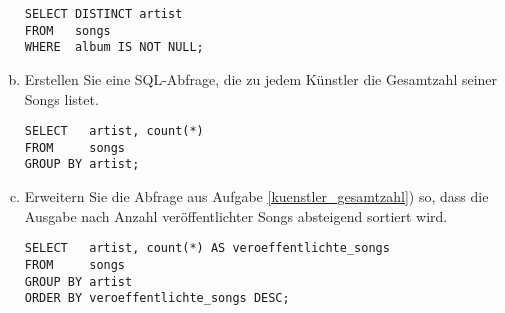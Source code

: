 \begin{enumerate}[a)]
\cprotEnv
	\begin{note}
	\begin{lstlisting}
SELECT DISTINCT artist
FROM   songs
WHERE  album IS NOT NULL;
	\end{lstlisting}
	\end{note}

	\item \label{kuenstler_gesamtzahl} Erstellen \deepen Sie eine SQL-Abfrage, die zu jedem Künstler die Gesamtzahl seiner Songs listet.

\cprotEnv
	\begin{note}
	\begin{lstlisting}
SELECT   artist, count(*)
FROM     songs
GROUP BY artist;
	\end{lstlisting}
	\end{note}


	\item Erweitern \deepen Sie die Abfrage aus Aufgabe \ref{kuenstler_gesamtzahl}) so, dass die Ausgabe nach Anzahl veröffentlichter Songs absteigend sortiert wird.

\cprotEnv
	\begin{note}
	\begin{lstlisting}
SELECT   artist, count(*) AS veroeffentlichte_songs
FROM     songs
GROUP BY artist
ORDER BY veroeffentlichte_songs DESC;
	\end{lstlisting}
	\end{note}

\end{enumerate}

